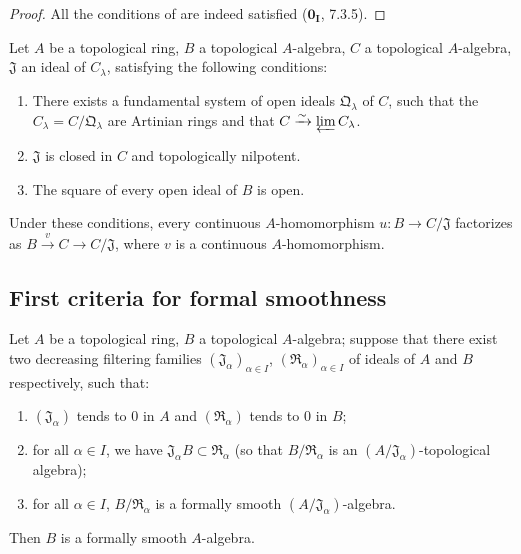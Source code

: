 \begin{proof}
All the conditions of  are indeed satisfied ($\mathbf{0_I}$, 7.3.5).
\end{proof}

\begin{proposition}[19.3.12]
\label{0.19.3.12}
Let $A$ be a topological ring, $B$ a topological $A$-algebra, $C$ a topological $A$-algebra, $\mathfrak{J}$ an ideal of $C_\lambda$, satisfying the following conditions:
\begin{enumerate}
  \item[$1^\circ$] There exists a fundamental system of open ideals $\mathfrak{Q}_\lambda$ of $C$, such that the $C_\lambda=C/\mathfrak{Q}_\lambda$ are Artinian rings and that $C\xrightarrow{\sim}\varprojlim C_\lambda$.
  \item[$2^\circ$] $\mathfrak{J}$ is closed in $C$ and topologically nilpotent.
  \item[$3^\circ$] The square of every open ideal of $B$ is open.
\end{enumerate}
Under these conditions, every continuous $A$-homomorphism $u:B\to C/\mathfrak{J}$ factorizes as $B\xrightarrow{v}C\to C/\mathfrak{J}$, where $v$ is a continuous $A$-homomorphism.
\end{proposition}

\subsection{First criteria for formal smoothness}
\label{subsection:0.19.4}

\begin{proposition}[19.4.1]
\label{0.19.4.1}
Let $A$ be a topological ring, $B$ a topological $A$-algebra;
suppose that there exist two decreasing filtering families $(\mathfrak{J}_\alpha)_{\alpha\in I}$, $(\mathfrak{R}_\alpha)_{\alpha\in I}$ of ideals of $A$ and $B$ respectively, such that:
\begin{enumerate}
  \item[$1^\circ$] $(\mathfrak{J}_\alpha)$ tends to $0$ in $A$ and $(\mathfrak{R}_\alpha)$ tends to $0$ in $B$;
  \item[$2^\circ$] for all $\alpha\in I$, we have $\mathfrak{J}_\alpha B\subset\mathfrak{R}_\alpha$ (so that $B/\mathfrak{R}_\alpha$ is an $(A/\mathfrak{J}_\alpha)$-topological algebra);
  \item[$3^\circ$] for all $\alpha\in I$, $B/\mathfrak{R}_\alpha$ is a formally smooth $(A/\mathfrak{J}_\alpha)$-algebra.
\end{enumerate}
Then $B$ is a formally smooth $A$-algebra.
\end{proposition}

